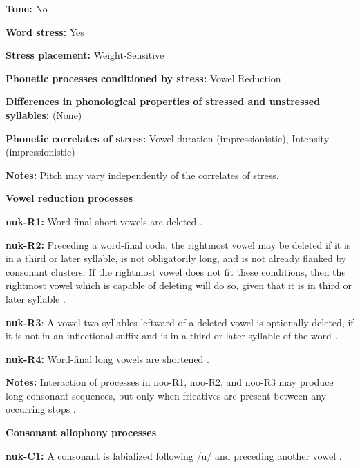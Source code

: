\textbf{Tone:} No



\textbf{Word stress:} Yes



\textbf{Stress placement:} Weight-Sensitive



\textbf{Phonetic processes conditioned by stress:} Vowel Reduction



\textbf{Differences in phonological properties of stressed and unstressed syllables:} (None)



\textbf{Phonetic correlates of stress:} Vowel duration (impressionistic), Intensity (impressionistic)



\textbf{Notes:} Pitch may vary independently of the correlates of stress.



\textbf{Vowel reduction processes}



\textbf{nuk-R1:} Word-final short vowels are deleted \citep[25]{Rose1981}.



\textbf{nuk-R2:} Preceding a word-final coda, the rightmost vowel may be deleted if it is in a third or later syllable, is not obligatorily long, and is not already flanked by consonant clusters. If the rightmost vowel does not fit these conditions, then the rightmost vowel which is capable of deleting will do so, given that it is in third or later syllable \citep[25]{Rose1981}.



\textbf{nuk-R3}: A vowel two syllables leftward of a deleted vowel is optionally deleted, if it is not in an inflectional suffix and is in a third or later syllable of the word \citep[25]{Rose1981}.



\textbf{nuk-R4:} Word-final long vowels are shortened \citep[27]{Rose1981}.



\textbf{Notes:} Interaction of processes in noo-R1, noo-R2, and noo-R3 may produce long consonant sequences, but only when fricatives are present between any occurring stops \citep[26]{Rose1981}.



\textbf{Consonant allophony processes}



\textbf{nuk-C1:} A consonant is labialized following /u/ and preceding another vowel \citep[27]{Stonham1999}.



